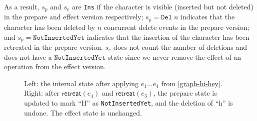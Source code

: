\documentclass[sigplan,10pt]{acmart}
\begin{document}
As a result, $s_p$ and $s_e$ are \texttt{Ins} if the character is visible (inserted but not deleted) in the prepare and effect version respectively; $s_p = \texttt{Del}\; n$ indicates that the character has been deleted by $n$ concurrent delete events in the prepare version; and $s_p = \texttt{NotInsertedYet}$ indicates that the insertion of the character has been retreated in the prepare version.
$s_e$ does not count the number of deletions and does not have a $\texttt{NotInsertedYet}$ state since we never remove the effect of an operation from the effect version.

\begin{figure}
  \caption{Left: the internal state after applying $e_1 ... e_4$ from \autoref{graph-hi-hey}. Right: after $\mathsf{retreat}(e_4)$ and $\mathsf{retreat}(e_3)$, the prepare state is updated to mark ``H'' as \texttt{NotInsertedYet}, and the deletion of ``h'' is undone. The effect state is unchanged.}
  \label{crdt-state-1}
\end{figure}
\end{document}

